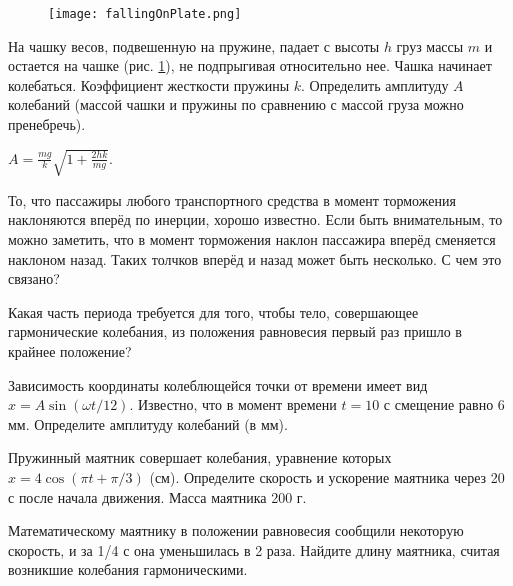 \begin{figure}[h]
\centering
\texttt{[image: fallingOnPlate.png]}
\caption{}
\label{fallingOnPlate}
\end{figure}

\begin{ex} %
На чашку весов, подвешенную на пружине, падает с высоты $h$ груз массы $m$ и остается на чашке (рис. \ref{fallingOnPlate}), не подпрыгивая относительно нее. Чашка начинает колебаться. Коэффициент жесткости пружины $k$. Определить амплитуду $A$ колебаний (массой чашки и пружины по сравнению с массой груза можно пренебречь).
\begin{ans}
$A = \frac{mg}{k}\sqrt{ 1 + \frac{2hk}{mg}}$.
\end{ans}
\end{ex}	

\qualProblems

\begin{ex}
То, что пассажиры любого транспортного средства в момент торможения наклоняются вперёд по инерции, хорошо известно. Если быть внимательным, то можно заметить, что в момент торможения наклон пассажира вперёд сменяется наклоном назад. Таких толчков вперёд и назад может быть несколько. С чем это связано?
\end{ex}	

\begin{ex}
Какая часть периода требуется для того, чтобы тело, совершающее гармонические колебания, из положения равновесия первый раз пришло в крайнее положение?
\end{ex}	

\simpleProblems

\begin{ex}
Зависимость координаты колеблющейся точки от времени имеет вид $x = A\sin(\omega t/12)$. Известно, что в момент времени $t = 10$ с смещение равно 6 мм. Определите амплитуду колебаний (в мм).
\end{ex}	

\begin{ex}
Пружинный маятник совершает колебания, уравнение которых $x = 4\cos(\pi t + \pi/3)$ (см). Определите скорость и ускорение маятника через 20 с после начала движения. Масса маятника 200 г.
\end{ex}	

\begin{ex}
Математическому маятнику в положении равновесия сообщили некоторую скорость, и за 1/4 с она уменьшилась в 2 раза. Найдите длину маятника, считая возникшие колебания гармоническими.
\end{ex}	

